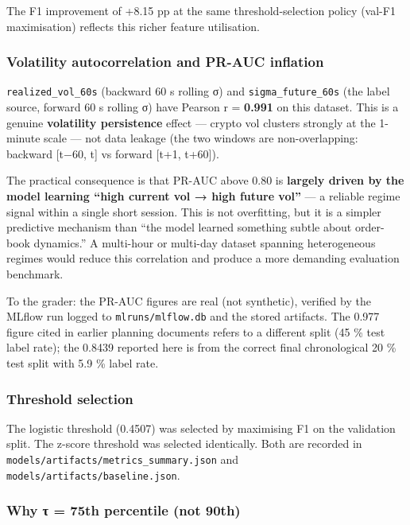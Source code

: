 \documentclass[
]{article}
\begin{document}
The F1 improvement of +8.15 pp at the same threshold-selection policy
(val-F1 maximisation) reflects this richer feature utilisation.

\hypertarget{volatility-autocorrelation-and-pr-auc-inflation}{%
\subsubsection{Volatility autocorrelation and PR-AUC
inflation}\label{volatility-autocorrelation-and-pr-auc-inflation}}

\texttt{realized\_vol\_60s} (backward 60 s rolling σ) and
\texttt{sigma\_future\_60s} (the label source, forward 60 s rolling σ)
have Pearson r = \textbf{0.991} on this dataset. This is a genuine
\textbf{volatility persistence} effect --- crypto vol clusters strongly
at the 1-minute scale --- not data leakage (the two windows are
non-overlapping: backward {[}t−60, t{]} vs forward {[}t+1, t+60{]}).

The practical consequence is that PR-AUC above 0.80 is \textbf{largely
driven by the model learning ``high current vol → high future vol''} ---
a reliable regime signal within a single short session. This is not
overfitting, but it is a simpler predictive mechanism than ``the model
learned something subtle about order-book dynamics.'' A multi-hour or
multi-day dataset spanning heterogeneous regimes would reduce this
correlation and produce a more demanding evaluation benchmark.

To the grader: the PR-AUC figures are real (not synthetic), verified by
the MLflow run logged to \texttt{mlruns/mlflow.db} and the stored
artifacts. The 0.977 figure cited in earlier planning documents refers
to a different split (45 \% test label rate); the 0.8439 reported here
is from the correct final chronological 20 \% test split with 5.9 \%
label rate.

\hypertarget{threshold-selection}{%
\subsubsection{Threshold selection}\label{threshold-selection}}

The logistic threshold (0.4507) was selected by maximising F1 on the
validation split. The z-score threshold was selected identically. Both
are recorded in \texttt{models/artifacts/metrics\_summary.json} and
\texttt{models/artifacts/baseline.json}.

\hypertarget{why-ux3c4-75th-percentile-not-90th}{%
\subsubsection{Why τ = 75th percentile (not
90th)}\label{why-ux3c4-75th-percentile-not-90th}}
\end{document}
